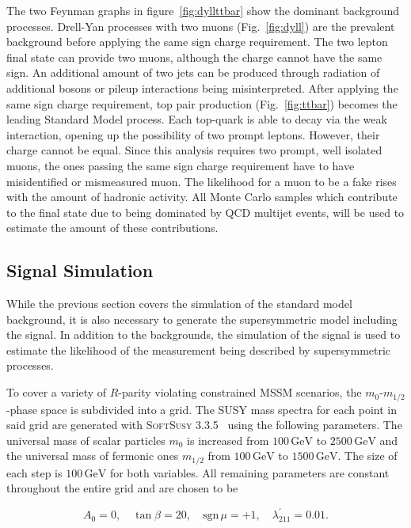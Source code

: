 The two Feynman graphs in figure~\ref{fig:dyllttbar} show the dominant background processes. Drell-Yan processes with two muons (Fig.~\ref{fig:dyll}) are the prevalent background before applying the same sign charge requirement. The two lepton final state can provide two muons, although the charge cannot have the same sign. An additional amount of two jets can be produced through radiation of additional bosons or pileup interactions being misinterpreted. After applying the same sign charge requirement, top pair production (Fig.~\ref{fig:ttbar}) becomes the leading Standard Model process. Each top-quark is able to decay via the weak interaction, opening up the possibility of two prompt leptons. However, their charge cannot be equal. Since this analysis requires two prompt, well isolated muons, the ones passing the same sign charge requirement have to have misidentified or mismeasured muon. The likelihood for a muon to be a fake rises with the amount of hadronic activity. All Monte Carlo samples which contribute to the final state due to being dominated by QCD multijet events, will be used to estimate the amount of these contributions.


\subsection{Signal Simulation}
\label{sec:signal-sim}

While the previous section covers the simulation of the standard model background, it is also necessary to generate the supersymmetric model including the signal. In addition to the backgrounds, the simulation of the signal is used to estimate the likelihood of the measurement being described by supersymmetric processes.

To cover a variety of $R$-parity violating constrained MSSM scenarios, the $m_0$-$m_{1/2}$-phase space is subdivided into a grid. The SUSY mass spectra for each point in said grid are generated with \textsc{SoftSusy 3.3.5}~\cite{softsusy,sonnegueth} using the following parameters. The universal mass of scalar particles $m_0$ is increased from $100\,\text{GeV}$ to $2500\,\text{GeV}$ and the universal mass of fermonic ones $m_{1/2}$ from $100\,\text{GeV}$ to $1500\,\text{GeV}$. The size of each step is $100\,\text{GeV}$ for both variables. All remaining parameters are constant throughout the entire grid and are chosen to be

\begin{equation}
  \label{eq:gen-mssm-parameters}
  A_0 = 0, \quad \tan{\beta} = 20, \quad \text{sgn}\,\mu = +1, \quad \lambda^\prime_{211} = 0.01.
\end{equation}

